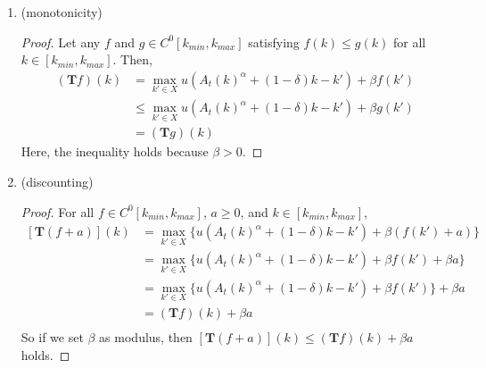 \documentclass[a4paper, 10pt]{article}
\theoremstyle{definition}
\begin{document}
\begin{description}
		\begin{enumerate}[a]
			\item (monotonicity)
				\begin{proof}
				Let any $f$ and $g \in C^0[k_{min}, k_{max}]$ satisfying $f(k) \leq g(k) $ for all $ k \in [k_{min}, k_{max}]$.
				Then,
				\begin{displaymath}\begin{split}
					(\textbf{T}f)(k) &= \max_{k'\in X} u(A_t(k)^\alpha + (1-\delta)k - k') + \beta f(k')\\
								&\leq \max_{k'\in X} u(A_t(k)^\alpha + (1-\delta)k - k') + \beta g(k')\\
								&= (\textbf{T}g)(k)
				\end{split}
				\end{displaymath}
				Here, the inequality holds because $\beta >0$.
				\end{proof}
			\item (discounting)
				\begin{proof}
				For all $f \in C^0[k_{min},k_{max}]$, $a \geq 0$, and $ k \in [k_{min}, k_{max}]$,
				\begin{displaymath}\begin{split}
					[\textbf{T}(f+a)](k) &= \max_{k'\in X} \{u(A_t(k)^\alpha + (1-\delta)k - k') + \beta( f(k') + a)\}\\
									&= \max_{k'\in X} \{u(A_t(k)^\alpha + (1-\delta)k - k') + \beta f(k') + \beta a\}\\
									&= \max_{k'\in X} \{u(A_t(k)^\alpha + (1-\delta)k - k') + \beta f(k')\} + \beta a\\
									&= (\textbf{T}f)(k) + \beta a\\
				\end{split}\end{displaymath}
				So if we set $\beta$ as modulus, then $[\textbf{T}(f+a)](k) \leq (\textbf{T}f)(k) + \beta a$ holds.
				\end{proof}
		\end{enumerate}
		
	\end{description}
\end{document}
